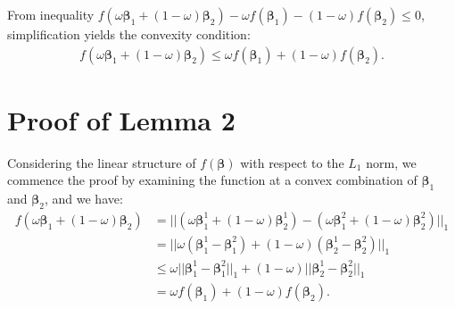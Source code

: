 \documentclass[final,3p,times]{elsarticle}
\begin{document}
From inequality $f(\omega\boldsymbol{\beta}_1+(1-\omega)
\boldsymbol{\beta}_2)- \omega f(\boldsymbol{\beta}_1)-
(1-\omega)f(\boldsymbol{\beta}_2)\le0$, simplification 
yields the convexity condition:
\begin{equation*}
\begin{aligned}
f(\omega\boldsymbol{\beta}_1+(1-\omega)\boldsymbol{\beta}_
2)\le \omega f(\boldsymbol{\beta}_1)+(1-\omega)
f(\boldsymbol{\beta}_2).
\end{aligned}
\end{equation*}

\section{Proof of Lemma 2}
Considering the linear structure of $f(\boldsymbol
{\beta})$ with respect to the $L_1$ norm, we commence 
the proof by examining the function at a convex 
combination of $\boldsymbol{\beta}_1$ and $\boldsymbol
{\beta}_2$, and we have:
\begin{equation*}
  \begin{aligned}
    f(\omega\boldsymbol{\beta}_1+(1-\omega)\boldsymbol{\beta}_2)
    &=||(\omega\boldsymbol{\beta}_1^1+(1-\omega)\boldsymbol{\beta}_2^1)-(\omega\boldsymbol{\beta}_1^2+(1-\omega)\boldsymbol{\beta}_2^2)||_1 \\
    &= ||\omega(\boldsymbol{\beta}_1^1-\boldsymbol{\beta}_1^2)+(1-\omega)(\boldsymbol{\beta}_2^1-\boldsymbol{\beta}_2^2)||_1 \\
    &\le \omega||\boldsymbol{\beta}_1^1-\boldsymbol{\beta}_1^2||_1+(1-\omega)||\boldsymbol{\beta}_2^1-\boldsymbol{\beta}_2^2||_1 \\
    &= \omega f(\boldsymbol{\beta}_1)+(1-\omega)f(\boldsymbol{\beta}_2).
  \end{aligned}
\end{equation*}
\end{document}

